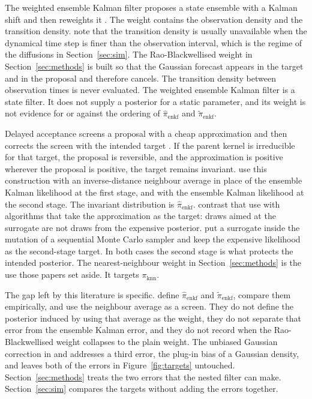 The weighted ensemble Kalman filter proposes a state ensemble with a Kalman shift and then reweights it \citep{papadakis2010}. The weight contains the observation density and the transition density. \citet{papadakis2010} note that the transition density is usually unavailable when the dynamical time step is finer than the observation interval, which is the regime of the diffusions in Section~\ref{sec:sim}. The Rao-Blackwellised weight in Section~\ref{sec:methods} is built so that the Gaussian forecast appears in the target and in the proposal and therefore cancels. The transition density between observation times is never evaluated. The weighted ensemble Kalman filter is a state filter. It does not supply a posterior for a static parameter, and its weight is not evidence for or against the ordering of \(\hat{\pi}_{\mathrm{enkf}}\) and \(\tilde{\pi}_{\mathrm{enkf}}\).

Delayed acceptance screens a proposal with a cheap approximation and then corrects the screen with the intended target \citep{christen2005}. If the parent kernel is irreducible for that target, the proposal is reversible, and the approximation is positive wherever the proposal is positive, the target remains invariant. \citet[Section~4.2]{golightly2026} use this construction with an inverse-distance neighbour average in place of the ensemble Kalman likelihood at the first stage, and with the ensemble Kalman likelihood at the second stage. The invariant distribution is \(\hat{\pi}_{\mathrm{enkf}}\). \citet[Section~5.1]{sherlock2016} contrast that use with algorithms that take the approximation as the target: draws aimed at the surrogate are not draws from the expensive posterior. \citet{bon2021} put a surrogate inside the mutation of a sequential Monte Carlo sampler and keep the expensive likelihood as the second-stage target. In both cases the second stage is what protects the intended posterior. The nearest-neighbour weight in Section~\ref{sec:methods} is the use those papers set aside. It targets \(\pi_{\mathrm{knn}}\).

The gap left by this literature is specific. \citet{golightly2026} define \(\hat{\pi}_{\mathrm{enkf}}\) and \(\tilde{\pi}_{\mathrm{enkf}}\), compare them empirically, and use the neighbour average as a screen. They do not define the posterior induced by using that average as the weight, they do not separate that error from the ensemble Kalman error, and they do not record when the Rao-Blackwellised weight collapses to the plain weight. The unbiased Gaussian correction in \citet{drovandi2022} and \citet{temfack2026} addresses a third error, the plug-in bias of a Gaussian density, and leaves both of the errors in Figure~\ref{fig:targets} untouched. Section~\ref{sec:methods} treats the two errors that the nested filter can make. Section~\ref{sec:sim} compares the targets without adding the errors together.
